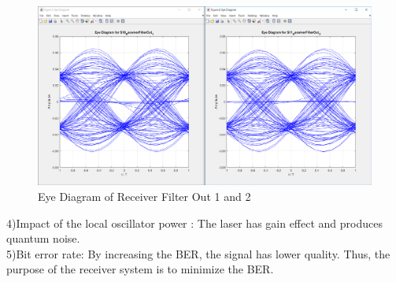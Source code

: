 \begin{figure}[h]
	\centering
	\includegraphics[width=1\textwidth]{../lib/m_qam_receiver/figures/S10_S11_eye.pdf}
	\caption{Eye Diagram of Receiver Filter Out 1 and 2}\label{fig:eyediagram1011}
\end{figure}
4)Impact of the local oscillator power : The laser has gain effect and produces quantum noise. \\
5)Bit error rate: By increasing the BER, the signal has lower quality. Thus, the purpose of the receiver system is to minimize the BER.

